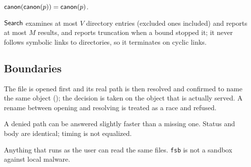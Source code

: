 \begin{law}
\label{law:canon}
$\mathsf{canon}(\mathsf{canon}(p))=\mathsf{canon}(p)$.
\end{law}

\begin{law}
\label{law:bounded}
$\mathsf{Search}$ examines at most $V$ directory entries (excluded ones included) and
reports at most $M$ results,
and reports truncation when a bound stopped it; it never follows symbolic links
to directories, so it terminates on cyclic links.
\end{law}

\subsection{Boundaries}

\begin{boundary}
The file is opened first and its real path is then resolved and confirmed to
name the same object (); the decision is taken on the object that
is actually served.  A rename between opening and resolving is treated as a
race and refused.
\end{boundary}

\begin{boundary}
A denied path can be answered slightly faster than a missing one.  Status and
body are identical; timing is not equalized.
\end{boundary}

\begin{boundary}
Anything that runs as the user can read the same files.  \texttt{fsb} is not a
sandbox against local malware.
\end{boundary}
